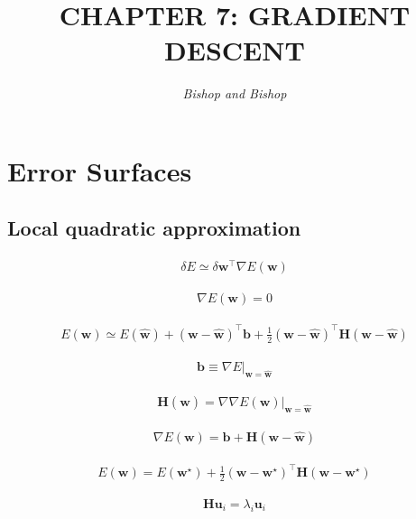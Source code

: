 \documentclass{article}
\title{\LARGE\scshape\MakeUppercase{Chapter 7: Gradient Descent}}
\author{\textit{Bishop and Bishop}}
\date{}
\begin{document}
\maketitle

\section{Error Surfaces}

\subsection{Local quadratic approximation}

\begin{align*}
\delta E \simeq \delta \mathbf{w}^{\top} \nabla E(\mathbf{w}) 
\tag{7.1}
\end{align*}

\begin{align*}
\nabla E(\mathbf{w})=0 
\tag{7.2}
\end{align*}

\begin{align*}
E(\mathbf{w}) \simeq E(\widehat{\mathbf{w}})+(\mathbf{w}-\widehat{\mathbf{w}})^{\top} \mathbf{b}+\frac{1}{2}(\mathbf{w}-\widehat{\mathbf{w}})^{\top} \mathbf{H}(\mathbf{w}-\widehat{\mathbf{w}})
\tag{7.3}
\end{align*}

\begin{align*}
\left.\mathbf{b} \equiv \nabla E\right|_{\mathbf{w}=\widehat{\mathbf{w}}}
\tag{7.4}
\end{align*}

\begin{align*}
\mathbf{H}(\widehat{\mathbf{w}})=\left.\nabla \nabla E(\mathbf{w})\right|_{\mathbf{w}=\widehat{\mathbf{w}}}
\tag{7.5}
\end{align*}

\begin{align*}
\nabla E(\mathbf{w})=\mathbf{b}+\mathbf{H}(\mathbf{w}-\widehat{\mathbf{w}})
\tag{7.6}
\end{align*}

\begin{align*}
E(\mathbf{w})=E\left(\mathbf{w}^{\star}\right)+\frac{1}{2}\left(\mathbf{w}-\mathbf{w}^{\star}\right)^{\top} \mathbf{H}\left(\mathbf{w}-\mathbf{w}^{\star}\right)
\tag{7.7}
\end{align*}

\begin{align*}
\mathbf{H} \mathbf{u}_{i}=\lambda_{i} \mathbf{u}_{i}
\tag{7.8}
\end{align*}
\end{document}
